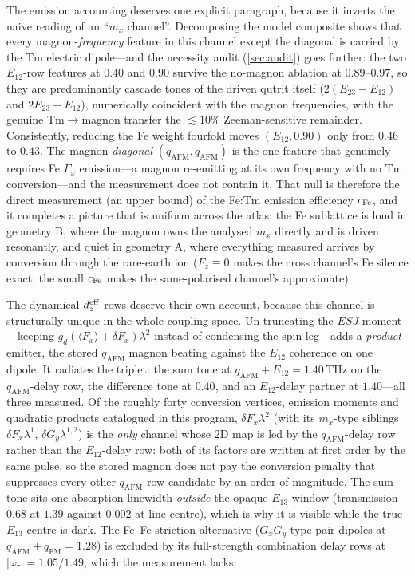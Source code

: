 \documentclass[11pt,a4paper]{article}
\newcommand{\qafm}{q_{\mathrm{AFM}}}
\newcommand{\qfm}{q_{\mathrm{FM}}}
\begin{document}
The emission accounting deserves one explicit paragraph, because it
inverts the naive reading of an ``$m_x$ channel''.  Decomposing the
model composite shows that every magnon-\emph{frequency} feature in
this channel except the diagonal is carried by the Tm electric
dipole---and the necessity audit (\cref{sec:audit}) goes further: the
two $E_{12}$-row features at $0.40$ and $0.90$ survive the no-magnon
ablation at $0.89$--$0.97$, so they are predominantly cascade tones
of the driven qutrit itself ($2(E_{23}{-}E_{12})$ and
$2E_{23}{-}E_{12}$), numerically coincident with the magnon
frequencies, with the genuine Tm$\to$magnon transfer the
$\lesssim10\%$ Zeeman-sensitive remainder.  Consistently, reducing
the Fe weight fourfold moves $(E_{12},0.90)$ only from $0.46$ to
$0.43$.
The magnon \emph{diagonal} $(\qafm,\qafm)$ is the one feature that
genuinely requires Fe $F_x$ emission---a magnon re-emitting at its own
frequency with no Tm conversion---and the measurement does not contain
it.  That null is therefore the direct measurement (an upper bound) of
the Fe:Tm emission efficiency $c_{\rm Fe}$, and it completes a picture
that is uniform across the atlas: the Fe sublattice is loud in
geometry B, where the magnon owns the analysed $m_x$ directly and is
driven resonantly, and quiet in geometry A, where everything measured
arrives by conversion through the rare-earth ion ($F_z\equiv0$ makes
the cross channel's Fe silence exact; the small $c_{\rm Fe}$ makes the
same-polarised channel's approximate).

The dynamical $d_z^{\rm eff}$ rows deserve their own account, because
this channel is structurally unique in the whole coupling space.
Un-truncating the $ESJ$ moment---keeping
$g_d(\langle F_x\rangle+\delta F_x)\lambda^2$ instead of condensing
the spin leg---adds a \emph{product} emitter, the stored $\qafm$
magnon beating against the $E_{12}$ coherence on one dipole.  It
radiates the triplet: the sum tone at $\qafm{+}E_{12}=1.40$\,THz on
the $\qafm$-delay row, the difference tone at $0.40$, and an
$E_{12}$-delay partner at $1.40$---all three measured.  Of the roughly
forty conversion vertices, emission moments and quadratic products
catalogued in this program, $\delta F_x\lambda^2$ (with its
$m_x$-type siblings $\delta F_x\lambda^1$, $\delta G_y\lambda^{1,2}$)
is the \emph{only} channel whose 2D map is led by the $\qafm$-delay
row rather than the $E_{12}$-delay row: both of its factors are
written at first order by the same pulse, so the stored magnon does
not pay the conversion penalty that suppresses every other
$\qafm$-row candidate by an order of magnitude.  The sum tone sits one
absorption linewidth \emph{outside} the opaque $E_{13}$ window
(transmission $0.68$ at $1.39$ against $0.002$ at line centre), which
is why it is visible while the true $E_{13}$ centre is dark.  The
Fe--Fe striction alternative ($G_xG_y$-type pair dipoles at
$\qafm{+}\qfm=1.28$) is excluded by its full-strength combination
delay rows at $|\omega_\tau|=1.05/1.49$, which the measurement lacks.
\end{document}
